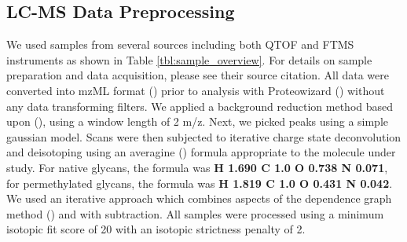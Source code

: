 \subsection{LC-MS Data Preprocessing}
    We used samples from several sources including both QTOF and FTMS instruments as shown
    in Table \ref{tbl:sample_overview}. For details on sample preparation and data acquisition,
    please see their source citation. All data were converted into mzML format (\cite{Martens2011})
    prior to analysis with Proteowizard (\cite{Kessner2008}) without any data transforming filters.
    We applied a background reduction method based upon (\cite{Kaur2006}), using a window length
    of 2 m/z. Next, we picked peaks using a simple gaussian model. Scans were then subjected
    to iterative charge state deconvolution and deisotoping using an averagine (\cite{Senko1995})
    formula appropriate to the molecule under study. For native glycans, the formula was
    \textbf{H 1.690 C 1.0 O 0.738 N 0.071}, for permethylated glycans, the formula was
    \textbf{H 1.819 C 1.0 O 0.431 N 0.042}. We used an iterative approach which combines
    aspects of the dependence graph method (\cite{Liu2010}) and with subtraction. All samples
    were processed using a minimum isotopic fit score of 20 with an isotopic strictness penalty
    of 2.

